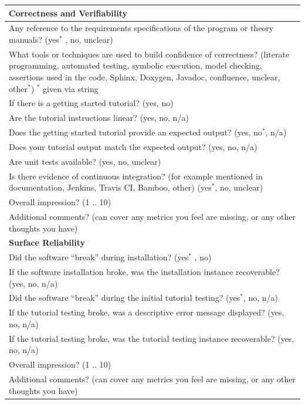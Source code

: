 \documentclass[letterpaper,cleveref]{lipics-v2019}
\begin{document}
\def\arraystretch{1.33}
\begin{tabular}{p{14cm}}
	\hline		
	\textbf{Correctness and Verifiability}\\
	\hline
	Any reference to the requirements specifications of the program or theory
	manuals? ({yes$^*$ , no, unclear})\\
	What tools or techniques are used to build confidence of correctness?
	({literate programming, automated testing, symbolic execution, model checking,
	assertions used in the code, Sphinx, Doxygen, Javadoc, confluence, unclear,
	other$^*$}) $^*$ given via string\\
	If there is a getting started tutorial? ({yes, no})\\
	Are the tutorial instructions linear? ({yes, no, n/a})\\
	Does the getting started tutorial provide an expected output? ({yes, no$^*$,
	n/a})\\
	Does your tutorial output match the expected output? ({yes, no, n/a})\\
	Are unit tests available?  ({yes, no, unclear})\\
	Is there evidence of continuous integration? (for example mentioned in
	documentation, Jenkins, Travis CI, Bamboo, other) ({yes$^*$, no, unclear})\\
	Overall impression? ({1 .. 10})\\
	Additional comments? (can cover any metrics you feel are missing, or any other
	thoughts you have) \\
	\hline	
	\textbf{Surface Reliability}\\
	\hline
	Did the software “break” during installation? ({yes$^*$ , no})\\
	If the software installation broke, was the installation instance recoverable?
	({yes, no, n/a})\\
	Did the software “break” during the initial tutorial testing? ({yes$^*$, no,
	n/a})\\
	If the tutorial testing broke, was a descriptive error message displayed?
	({yes, no, n/a})\\
	If the tutorial testing broke, was the tutorial testing instance recoverable?
	({yes, no, n/a})\\
	Overall impression? ({1 .. 10})\\
	Additional comments? (can cover any metrics you feel are missing, or any other
	thoughts you have)\\
	\hline		
\end{tabular}
\end{document}
